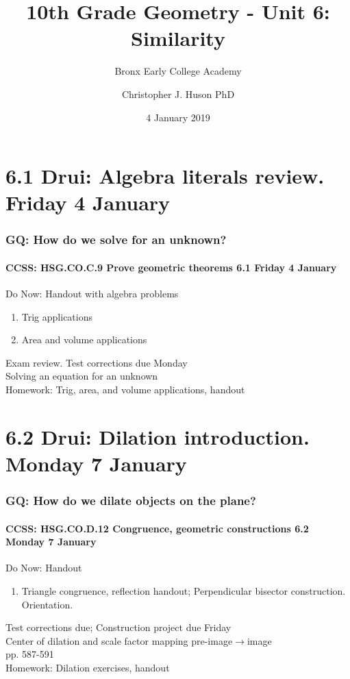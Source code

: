 \documentclass{beamer}
\title{10th Grade Geometry - Unit 6: Similarity}
\subtitle{Bronx Early College Academy}
\author{Christopher J. Huson PhD}
\date{4 January 2019}
\begin{document}
\frame{\titlepage}
\section[Outline]{}
\frame{\tableofcontents}

\section{6.1 Drui: Algebra literals review. Friday 4 January}
  \frame
  {
    \frametitle{GQ: How do we solve for an unknown?}
    \framesubtitle{CCSS: HSG.CO.C.9 Prove geometric theorems  \alert{6.1 Friday 4 January}}

    \begin{block}{Do Now: Handout with algebra problems}
      \begin{enumerate}
        \item Trig applications
        \item Area and volume applications
      \end{enumerate}
    \end{block}
    Exam review. Test corrections due Monday \\
    Solving an equation for an unknown \\[0.5cm]
    Homework: Trig, area, and volume applications, handout\\
  }

\section{6.2 Drui: Dilation introduction. Monday 7 January}
  \frame
  {
    \frametitle{GQ: How do we dilate objects on the plane?}
    \framesubtitle{CCSS: HSG.CO.D.12 Congruence, geometric constructions  \alert{6.2 Monday 7 January}}

    \begin{block}{Do Now: Handout}
      \begin{enumerate}
        \item Triangle congruence, reflection handout; Perpendicular bisector construction. Orientation.
      \end{enumerate}
    \end{block}
    Test corrections due; Construction project due Friday\\
    Center of dilation and scale factor mapping pre-image$\rightarrow$image\\
    pp. 587-591\\[0.5cm] %
    Homework: Dilation exercises, handout\\
  }
\end{document}
